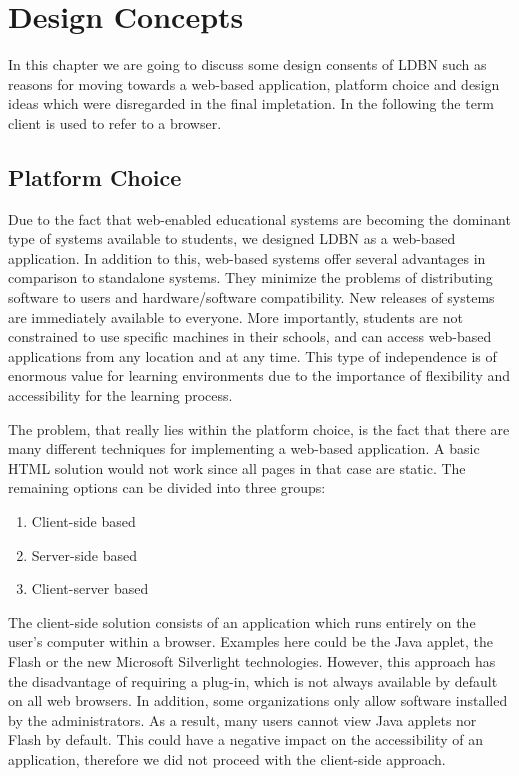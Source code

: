 \chapter{Design Concepts}
\label{chap:design}
In this chapter we are going to discuss some design consents of LDBN such as
reasons for moving towards a web-based application, platform choice and 
design ideas which were disregarded in the final impletation. In the following the
term client is used to refer to a browser.

\section{Platform Choice}
Due to the fact that web-enabled educational 
systems are becoming the dominant type of systems 
available to students, we designed LDBN as a web-based application.
In addition to this, web-based systems offer several advantages in comparison to 
standalone systems. They minimize the problems of distributing software to users 
and hardware/software compatibility. New releases of systems are immediately
available to everyone. More importantly, students are not
constrained to use specific machines in their schools, and can access 
web-based applications from any location and at any time. This type of independence 
is of enormous value for learning environments due to the importance of
flexibility and accessibility for the learning process.
 
The problem, that really lies within the platform choice, is the fact that there are
many different techniques for implementing a web-based application. A basic HTML 
solution would not work since all pages in that case are static. The remaining 
options can be divided into three groups:

\begin{enumerate}
	\item Client-side based
	\item Server-side based
	\item Client-server based
\end{enumerate}

The client-side solution consists of an application which runs entirely on the user's 
computer within a browser. Examples here could be the Java applet, the Flash or the new 
Microsoft Silverlight technologies. However, this approach has the disadvantage
of requiring a plug-in, which is not always available by default on all web browsers. 
In addition, some organizations only allow software installed by the administrators. 
As a result, many users cannot view Java applets nor Flash by default. This could 
have a negative impact on the accessibility of an application, 
therefore we did not proceed with the client-side approach.

